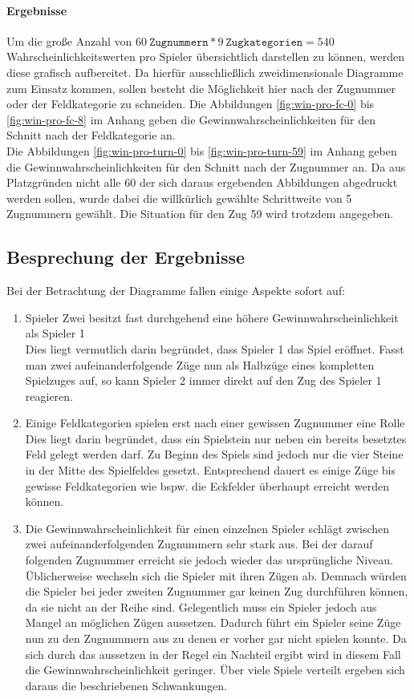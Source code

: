 \paragraph{Ergebnisse}
Um die große Anzahl von $60\ \mathtt{Zugnummern} * 9\ \mathtt{Zugkategorien} = 540$ Wahrscheinlichkeitswerten pro Spieler übersichtlich darstellen zu können, werden diese grafisch aufbereitet. Da hierfür ausschließlich zweidimensionale Diagramme zum Einsatz kommen, sollen besteht die Möglichkeit hier nach der Zugnummer oder der Feldkategorie zu schneiden. Die Abbildungen \ref{fig:win-pro-fc-0} bis \ref{fig:win-pro-fc-8} im Anhang geben die Gewinnwahrscheinlichkeiten für den Schnitt nach der Feldkategorie an.
\\Die Abbildungen \ref{fig:win-pro-turn-0} bis \ref{fig:win-pro-turn-59} im Anhang geben die Gewinnwahrscheinlichkeiten für den Schnitt nach der Zugnummer an. Da aus Platzgründen nicht alle 60 der sich daraus ergebenden Abbildungen abgedruckt werden sollen, wurde dabei die willkürlich gewählte Schrittweite von 5 Zugnummern gewählt. Die Situation für den Zug 59 wird trotzdem angegeben.

\subsection{Besprechung der Ergebnisse}
Bei der Betrachtung der Diagramme fallen einige Aspekte sofort auf:
\begin{enumerate}
\item Spieler Zwei besitzt fast durchgehend eine höhere Gewinnwahrscheinlichkeit als Spieler 1
\\Dies liegt vermutlich darin begründet, dass Spieler 1 das Spiel eröffnet. Fasst man zwei aufeinanderfolgende Züge nun als Halbzüge eines kompletten Spielzuges auf, so kann Spieler 2 immer direkt auf den Zug des Spieler 1 reagieren.
\item Einige Feldkategorien spielen erst nach einer gewissen Zugnummer eine Rolle
\\Dies liegt darin begründet, dass ein Spielstein nur neben ein bereits besetztes Feld gelegt werden darf. Zu Beginn des Spiels sind jedoch nur die vier Steine in der Mitte des Spielfeldes gesetzt. Entsprechend dauert es einige Züge bis gewisse Feldkategorien wie bspw. die Eckfelder überhaupt erreicht werden können.
\item Die Gewinnwahrscheinlichkeit für einen einzelnen Spieler schlägt zwischen zwei aufeinanderfolgenden Zugnummern sehr stark aus. Bei der darauf folgenden Zugnummer erreicht sie jedoch wieder das ursprüngliche Niveau.
\\Üblicherweise wechseln sich die Spieler mit ihren Zügen ab. Demnach würden die Spieler bei jeder zweiten Zugnummer gar keinen Zug durchführen können, da sie nicht an der Reihe sind. Gelegentlich muss ein Spieler jedoch aus Mangel an möglichen Zügen aussetzen. Dadurch führt ein Spieler seine Züge nun zu den Zugnummern aus zu denen er vorher gar nicht spielen konnte. Da sich durch das aussetzen in der Regel ein Nachteil ergibt wird in diesem Fall die Gewinnwahrscheinlichkeit geringer. Über viele Spiele verteilt ergeben sich daraus die beschriebenen Schwankungen.
\end{enumerate}
